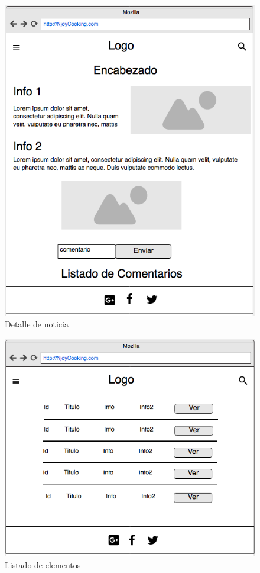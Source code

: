 \begin{figure}
\begin{center}
\includegraphics[width=1.0\textwidth]{imagenes/detalle-blog.png}
\caption{Detalle de noticia}
\label{detalle-blog}
\end{center}
\end{figure}

\begin{figure}
\begin{center}
\includegraphics[width=1.0\textwidth]{imagenes/listado-admin.png}
\caption{Listado de elementos}
\label{listado-admin}
\end{center}
\end{figure}

